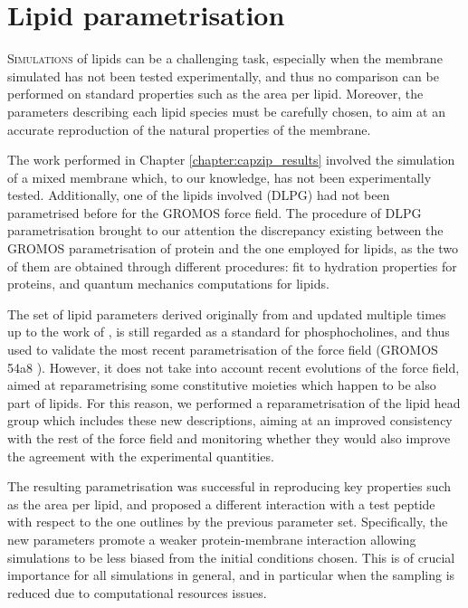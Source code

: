 \chapter{Lipid parametrisation} \label{chapter:lip_par}

\lettrine{S}{imulations} of lipids can be a challenging task, especially when the membrane simulated has not been tested experimentally, and thus no comparison can be performed on standard properties such as the area per lipid. Moreover, the parameters describing each lipid species must be carefully chosen, to aim at an accurate reproduction of the natural properties of the membrane.

The work performed in Chapter \ref{chapter:capzip_results} involved the simulation of a mixed membrane which, to our knowledge, has not been experimentally tested. Additionally, one of the lipids involved (DLPG) had not been parametrised before for the GROMOS force field.
%
The procedure of DLPG parametrisation brought to our attention the discrepancy existing between the GROMOS parametrisation of protein and the one employed for lipids, as the two of them are obtained through different procedures: fit to hydration properties for proteins, and quantum mechanics computations for lipids.

The set of lipid parameters derived originally from \citet{Chiu1995} and updated multiple times up to the work of \citet{PogerOrig}, is still regarded as a standard for phosphocholines, and thus used to validate the most recent parametrisation of the force field (GROMOS 54a8 \citep{Reif2012}). However, it does not take into account recent evolutions of the force field, aimed at reparametrising some constitutive moieties which happen to be also part of lipids.
%
For this reason, we performed a reparametrisation of the lipid head group which includes these new descriptions, aiming at an improved consistency with the rest of the force field and monitoring whether they would also improve the agreement with the experimental quantities.

The resulting parametrisation was successful in reproducing key properties such as the area per lipid, and proposed a different interaction with a test peptide with respect to the one outlines by the previous parameter set. Specifically, the new parameters promote a weaker protein-membrane interaction allowing simulations to be less biased from the initial conditions chosen. This is of crucial importance for all simulations in general, and in particular when the sampling is reduced due to computational resources issues.

